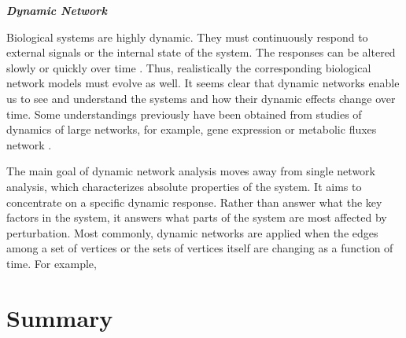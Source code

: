 \textbf{\textit{Dynamic Network}}

Biological systems are highly dynamic. They must continuously respond to external signals or the internal state of the system. The responses can be altered slowly or quickly over time \citep{Peer:2011jd}. Thus, realistically the corresponding biological network models must evolve as well. It seems clear that dynamic networks enable us to see and understand the systems and how their dynamic effects change over time. Some understandings previously have been obtained from studies of dynamics of large networks, for example, gene expression or metabolic fluxes network \citep{Idekerdiffnet}.

The main goal of dynamic network analysis moves away from single network analysis, which characterizes absolute properties of the system. It aims to concentrate on a specific dynamic response. Rather than answer what the key factors in the system, it answers what parts of the system are most affected by perturbation. Most commonly, dynamic networks are applied when the edges among a set of vertices or the sets of vertices itself are changing as a function of time. For example, 


\section*{Summary}

